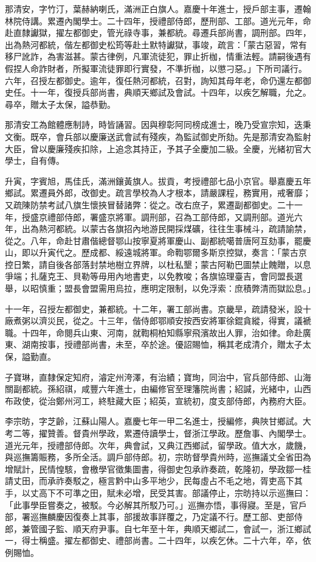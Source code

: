 \begin{pinyinscope}
那清安，字竹汀，葉赫納喇氏，滿洲正白旗人。嘉慶十年進士，授戶部主事，遷翰林院侍講。累遷內閣學士。二十四年，授禮部侍郎，歷刑部、工部。道光元年，命赴直隸讞獄，擢左都御史，管光祿寺事，兼都統。尋遷兵部尚書，調刑部。四年，出為熱河都統，偕左都御史松筠等赴土默特讞獄，事竣，疏言：「蒙古惡習，常有移尸訛詐，為害滋甚。蒙古律例，凡軍流徒犯，罪止折枷，情重法輕。請嗣後遇有假捏人命詐財者，所擬軍流徒罪即行實發，不準折枷，以懲刁惡。」下所司議行。六年，召授左都御史。逾年，復任熱河都統，召對，詢知其母年老，命仍還左都御史任。十一年，復授兵部尚書，典順天鄉試及會試。十四年，以疾乞解職，允之。尋卒，贈太子太保，謚恭勤。

那清安工為館體應制詩，時皆誦習。因與穆彰阿同榜成進士，晚乃受宣宗知，迭秉文衡。既卒，會兵部以慶廉送武會試有殘疾，為監試御史所劾。先是那清安為監射大臣，曾以慶廉殘疾扣除，上追念其持正，予其子全慶加二級。全慶，光緒初官大學士，自有傳。

升寅，字賓旭，馬佳氏，滿洲鑲黃旗人。拔貢，考授禮部七品小京官。舉嘉慶五年鄉試。累遷員外郎，改御史。疏言學校為人才根本，請嚴課程，務實用，戒奢靡；又疏陳防禁考試八旗生懷挾冒替諸弊：從之。改右庶子，累遷副都御史。二十一年，授盛京禮部侍郎，署盛京將軍。調刑部，召為工部侍郎，又調刑部。道光六年，出為熱河都統。以蒙古各旗招內地游民開採煤礦，往往生事械斗，疏請諭禁，從之。八年，命赴甘肅偕總督鄂山按寧夏將軍慶山、副都統噶普唐阿互劾事，罷慶山，即以升寅代之。歷成都、綏遠城將軍。命鞫鄂爾多斯京控獄，奏言：「蒙古京控日繁，請自後各部落封禁地樹立界牌，以杜私墾；蒙古阿勒巴圖禁止餽贈，以息爭端；扎薩克王、貝勒等毋用內地書吏，以免教唆；各旗協理臺吉，會同盟長選舉，以昭慎重；盟長會盟需用烏拉，應明定限制，以免浮索：庶積弊清而獄訟息。」

十一年，召授左都御史，兼都統。十二年，署工部尚書。京畿旱，疏請發米，設十廠煮粥以濟災民，從之。十三年，偕侍郎鄂順安按西安將軍徐錕貪縱，得實，議褫職。十四年，命閱兵山東、河南，就鞫桐柏知縣寧飛濱故出人罪，治如律。命赴廣東、湖南按事，授禮部尚書，未至，卒於途。優詔賜恤，稱其老成清介，贈太子太保，謚勤直。

子寶琳，直隸保定知府，濬定州洿澤，有治績；寶珣，同治中，官兵部侍郎、山海關副都統。孫紹祺，咸豐六年進士，由編修官至理籓院尚書；紹諴，光緒中，山西布政使，從治鄭州河工，終駐藏大臣；紹英，宣統初，度支部侍郎，內務府大臣。

李宗昉，字芝齡，江蘇山陽人。嘉慶七年一甲二名進士，授編修，典陜甘鄉試。大考二等，擢贊善。督貴州學政，累遷侍讀學士，督浙江學政。歷詹事、內閣學士。道光元年，授禮部侍郎。次年，典會試，又典江西鄉試，留學政。值大水，歲饑，與巡撫籌賑務，多所全活。調戶部侍郎。初，宗昉督學貴州時，巡撫議丈全省田為增賦計，民情惶駭，會檄學官徵集圖書，得御史包承祚奏疏，乾隆初，學政鄒一桂請丈田，而承祚奏駁之，極言黔中山多平地少，民每虛占不毛之地，胥吏高下其手，以丈高下不可準之田，賦未必增，民受其害。部議停止，宗昉持以示巡撫曰：「此事學臣嘗奏之，被駁。今必解其所駁乃可。」巡撫亦悟，事得寢。至是，官戶部，署巡撫麟慶因復奏上其事，部援故事詳覆之，乃定議不行。歷工部、吏部侍郎，兼管國子監、順天府尹事。自七年至十年，典順天鄉試二，會試一，浙江鄉試一，得士稱盛。擢左都御史、禮部尚書。二十四年，以疾乞休。二十六年，卒，依例賜恤。


\end{pinyinscope}
